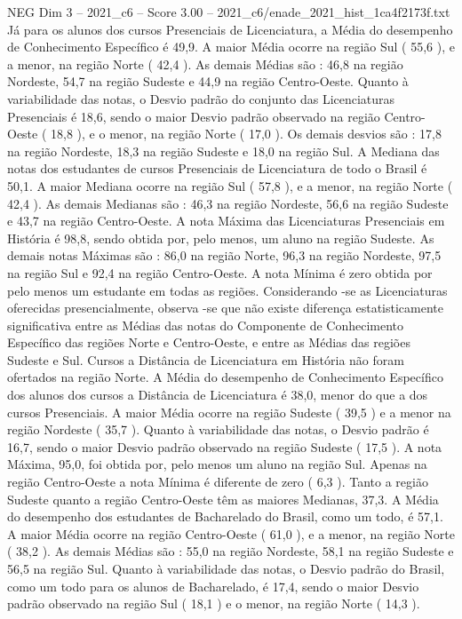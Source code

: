 \begin{textsample}{NEG Dim 3 – 2021\_c6 – Score 3.00 – 2021\_c6/enade\_2021\_hist\_1ca4f2173f.txt}
Já para os alunos dos cursos Presenciais de Licenciatura, a Média do desempenho de Conhecimento Específico é 49,9.
A maior Média ocorre na região Sul ( 55,6 ), e a menor, na região Norte ( 42,4 ).
As demais Médias são : 46,8 na região Nordeste, 54,7 na região Sudeste e 44,9 na região Centro-Oeste.
Quanto à variabilidade das notas, o Desvio padrão do conjunto das Licenciaturas Presenciais é 18,6, sendo o maior Desvio padrão observado na região Centro-Oeste ( 18,8 ), e o menor, na região Norte ( 17,0 ).
Os demais desvios são : 17,8 na região Nordeste, 18,3 na região Sudeste e 18,0 na região Sul.
A Mediana das notas dos estudantes de cursos Presenciais de Licenciatura de todo o Brasil é 50,1.
A maior Mediana ocorre na região Sul ( 57,8 ), e a menor, na região Norte ( 42,4 ).
As demais Medianas são : 46,3 na região Nordeste, 56,6 na região Sudeste e 43,7 na região Centro-Oeste.
A nota Máxima das Licenciaturas Presenciais em História é 98,8, sendo obtida por, pelo menos, um aluno na região Sudeste.
As demais notas Máximas são : 86,0 na região Norte, 96,3 na região Nordeste, 97,5 na região Sul e 92,4 na região Centro-Oeste.
A nota Mínima é zero obtida por pelo menos um estudante em todas as regiões.
Considerando -se as Licenciaturas oferecidas presencialmente, observa -se que não existe diferença estatisticamente significativa entre as Médias das notas do Componente de Conhecimento Específico das regiões Norte e Centro-Oeste, e entre as Médias das regiões Sudeste e Sul.
Cursos a Distância de Licenciatura em História não foram ofertados na região Norte.
A Média do desempenho de Conhecimento Específico dos alunos dos cursos a Distância de Licenciatura é 38,0, menor do que a dos cursos Presenciais.
A maior Média ocorre na região Sudeste ( 39,5 ) e a menor na região Nordeste ( 35,7 ).
Quanto à variabilidade das notas, o Desvio padrão é 16,7, sendo o maior Desvio padrão observado na região Sudeste ( 17,5 ).
A nota Máxima, 95,0, foi obtida por, pelo menos um aluno na região Sul.
Apenas na região Centro-Oeste a nota Mínima é diferente de zero ( 6,3 ).
Tanto a região Sudeste quanto a região Centro-Oeste têm as maiores Medianas, 37,3.
A Média do desempenho dos estudantes de Bacharelado do Brasil, como um todo, é 57,1.
A maior Média ocorre na região Centro-Oeste ( 61,0 ), e a menor, na região Norte ( 38,2 ).
As demais Médias são : 55,0 na região Nordeste, 58,1 na região Sudeste e 56,5 na região Sul.
Quanto à variabilidade das notas, o Desvio padrão do Brasil, como um todo para os alunos de Bacharelado, é 17,4, sendo o maior Desvio padrão observado na região Sul ( 18,1 ) e o menor, na região Norte ( 14,3 ).

\end{textsample}
